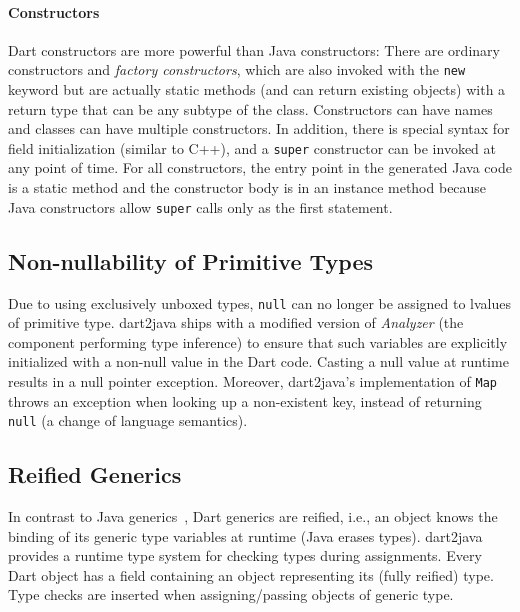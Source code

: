 \documentclass[sigplan]{acmart}
\begin{document}
\paragraph{Constructors}
Dart constructors are more powerful than Java constructors: There are ordinary constructors and \emph{factory constructors}, which are also invoked with the \texttt{new} keyword but are actually static methods (and can return existing objects) with a return type that can be any subtype of the class. Constructors can have names and classes can have multiple constructors. In addition, there is special syntax for field initialization (similar to C++), and a \texttt{super} constructor can be invoked at any point of time. For all constructors, the entry point in the generated Java code is a static method and the constructor body is in an instance method because Java constructors allow \texttt{super} calls only as the first statement.

\subsection{Non-nullability of Primitive Types}
Due to using exclusively unboxed types, \texttt{null} can no longer be assigned to lvalues of primitive type. dart2java ships with a modified version of \emph{Analyzer} (the component performing type inference) to ensure that such variables are explicitly initialized with a non-null value in the Dart code. Casting a null value at runtime results in a null pointer exception. Moreover, dart2java's implementation of \texttt{Map} throws an exception when looking up a non-existent key, instead of returning \texttt{null} (a change of language semantics).

\subsection{Reified Generics}
In contrast to Java generics~\cite{Bracha:1998:MFS:286936.286957}, Dart generics are reified, i.e., an object knows the binding of its generic type variables at runtime (Java erases types). dart2java provides a runtime type system for checking types during assignments. Every Dart object has a field containing an object representing its (fully reified) type. Type checks are inserted when assigning/passing objects of generic type. 
\end{document}
